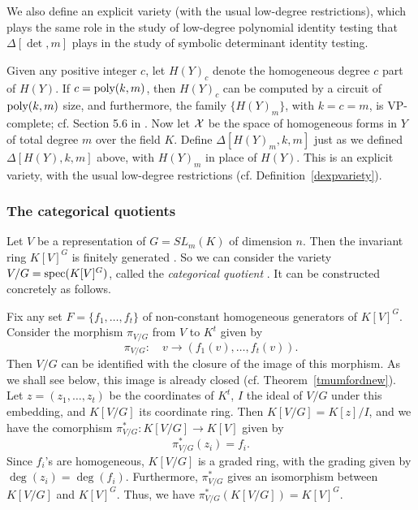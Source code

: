 \documentclass[11pt]{article}
\begin{document}
We also define  an explicit variety (with the usual low-degree restrictions), which 
plays the same role  in the study of  low-degree  polynomial identity testing
that $\Delta[\det,m]$ plays in the study of symbolic determinant identity testing.

Given any positive integer $c$, let $H(Y)_c$ denote the homogeneous degree $c$ part of $H(Y)$.
If $c={\mbox {poly}}(k,m)$, then $H(Y)_c$ can be computed by a circuit of ${\mbox {poly}}(k,m)$ size,
and furthermore, the family $\{H(Y)_m\}$, with $k=c=m$, is VP-complete; cf. Section 5.6 in \cite{burgbook}.
Now let ${\cal X}$  be the space of homogeneous forms in $Y$ of total degree $m$ over the field $K$.
Define $\Delta[H(Y)_m,k,m]$ just as we defined $\Delta[H(Y),k,m]$ above, with $H(Y)_m$ in place of $H(Y)$.
This  is an explicit variety,
with the usual low-degree restrictions (cf. Definition~\ref{dexpvariety}). 



\subsubsection{The categorical quotients} \label{scategorical}
Let $V$ be a representation of  $G=SL_m(K)$ of dimension $n$.
Then the invariant ring $K[V]^G$ is finitely generated \cite{hilbert}. So we can consider the
variety  $V/G={\mbox {spec}}(K[V]^G)$, called the {\em categorical quotient}  \cite{mumford}. 
It can be constructed  concretely as follows.

Fix any set $F=\{f_1,\ldots,f_t\}$  of non-constant homogeneous generators of $K[V]^G$. 
Consider the morphism $\pi_{V/G}$ from $V$ to $K^t$ given by 
\begin{equation} \label{eqmorphismgeneral}
\pi_{V/G}: \quad v \rightarrow (f_1(v),\ldots,f_t(v)).
\end{equation}
Then $V/G$ can be identified with the closure of the image of this morphism. As we shall
see below, this image is  already closed (cf. Theorem~\ref{tmumfordnew}).
Let $z=(z_1,\ldots,z_t)$ be the coordinates of $K^t$,  $I$ 
the ideal of $V/G$ under this embedding, and  $K[V/G]$ its coordinate ring. 
Then $K[V/G]=K[z]/I$, and we have the comorphism $\pi_{V/G}^*: K[V/G] \rightarrow K[V]$ given by 
\begin{equation}\label{eqmorphism2}
 \pi_{V/G}^*(z_i)=f_i. 
\end{equation}
Since $f_i$'s are homogeneous, $K[V/G]$ is a graded ring, with the grading given by $\deg(z_i)=\deg(f_i)$.
Furthermore, $\pi_{V/G}^*$ gives an isomorphism between $K[V/G]$ and $K[V]^G$. Thus, we have
$\pi_{V/G}^*(K[V/G])=K[V]^G$. 
\end{document}
